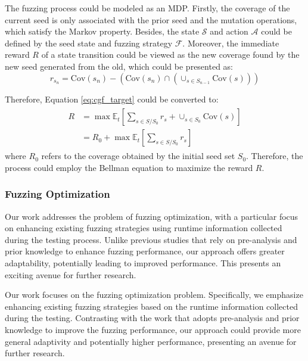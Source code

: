 \documentclass[lettersize,journal]{IEEEtran}
\begin{document}
The fuzzing process could be modeled as an MDP. Firstly, the coverage of the current seed is only associated with the prior seed and the mutation operations, which satisfy the Markov property. Besides, the state $\mathcal{S}$ and action $\mathcal{A}$ could be defined by the seed state and fuzzing strategy $\mathcal{F}$. Moreover,  the immediate reward $R$ of a state transition could be viewed as the new coverage found by the new seed generated from the old, which could be presented as:
\begin{equation}
	r_{s_{n}} = \text{Cov}(s_{n}) - \left(\text{Cov}(s_{n}) \cap (\cup_{s\in S_{n-1}}\text{Cov}(s))\right)
\end{equation}

Therefore, Equation \ref{eq:cgf_target} could be converted to:
\begin{align}
	\begin{split}
		R &= \max{\mathbb{E}_{t}\left[\sum_{s\in S/S_0}r_{s} + \cup_{s\in S_0}\text{Cov}(s)\right]} \\
		&= R_0 + \max{\mathbb{E}_{t}\left[\sum_{s\in S/S_0}r_{s}\right]}
	\end{split}
\end{align}
where $R_0$ refers to the coverage obtained by the initial seed set $S_0$. Therefore, the process could employ the Bellman equation\cite{richardbellmanTheoryDynamicProgramming1952} to maximize the reward $R$.

\subsubsection{Fuzzing Optimization}
Our work addresses the problem of fuzzing optimization, with a particular focus on enhancing existing fuzzing strategies using runtime information collected during the testing process. Unlike previous studies that rely on pre-analysis and prior knowledge to enhance fuzzing performance, our approach offers greater adaptability, potentially leading to improved performance. This presents an exciting avenue for further research.

Our work focuses on the fuzzing optimization problem. Specifically, we emphasize enhancing existing fuzzing strategies based on the runtime information collected during the testing. Contrasting with the work that adopts pre-analysis and prior knowledge to improve the fuzzing performance, our approach could provide more general adaptivity and potentially higher performance, presenting an avenue for further research.
\end{document}
